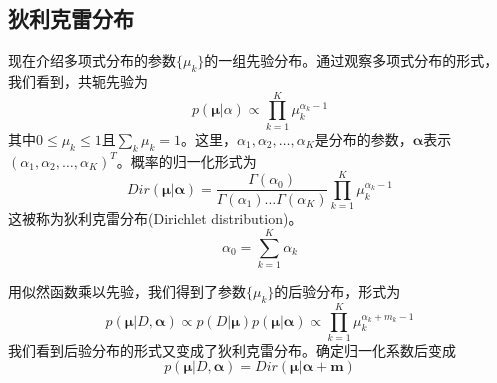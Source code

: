 \subsection*{狄利克雷分布}
现在介绍多项式分布的参数$\{\mu_k\}$的一组先验分布。通过观察多项式分布的形式，我们看到，共轭先验为
\begin{equation}
	p(\boldsymbol{\mu}|\alpha) \propto \prod_{k=1}^{K}\mu_k^{\alpha_k-1}
\end{equation}
其中$0\leqslant \mu_k \leqslant 1$且$\sum_k\mu_k=1$。这里，$\alpha_1,\alpha_2,\dots,\alpha_K$是分布的参数，$\boldsymbol{\alpha}$表示$(\alpha_1,\alpha_2,\dots,\alpha_K)^T$。概率的归一化形式为
\begin{equation}
	Dir(\boldsymbol{\mu}|\boldsymbol{\alpha})=\frac{\Gamma(\alpha_0)}{\Gamma(\alpha_1)\dots\Gamma(\alpha_K)}\prod_{k=1}^{K}\mu_k^{\alpha_k-1}
\end{equation}
这被称为狄利克雷分布(Dirichlet distribution)。
\begin{equation}
	\alpha_0=\sum_{k=1}^{K}\alpha_k
\end{equation}

用似然函数乘以先验，我们得到了参数$\{\mu_k\}$的后验分布，形式为
\begin{equation}
	p(\boldsymbol{\mu}|D,\boldsymbol{\alpha})\propto p(D|\boldsymbol{\mu})p(\boldsymbol{\mu}|\boldsymbol{\alpha}) \propto \prod_{k=1}^{K}\mu_k^{\alpha_k+m_k-1}
\end{equation}
我们看到后验分布的形式又变成了狄利克雷分布。确定归一化系数后变成
\begin{equation}
	p(\boldsymbol{\mu}|D,\boldsymbol{\alpha})=Dir(\boldsymbol{\mu}|\boldsymbol{\alpha}+\boldsymbol{m})
\end{equation}



